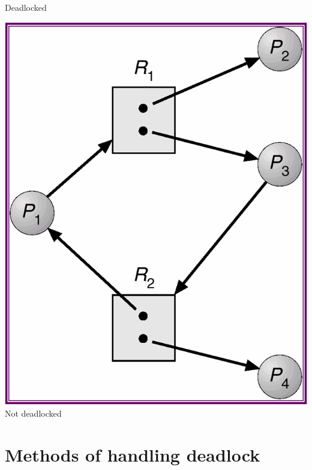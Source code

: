 \documentclass[CJKutf8,xcolor=pdftex,dvipsnames,table]{beamer}
\begin{document}
\begin{CJK*}{UTF8}{song}
\begin{frame}
\begin{minipage}[c]{0.5\textwidth}
    \newline Deadlocked \pause
  \end{minipage}%
  \begin{minipage}[c]{0.5\textwidth}
    \centering
    \includegraphics[scale=.3]{v6f8-3} \pause
    \newline Not deadlocked
  \end{minipage}
  \end{frame}

\section{Methods of handling deadlock}
  

\end{CJK*}
\end{document}
